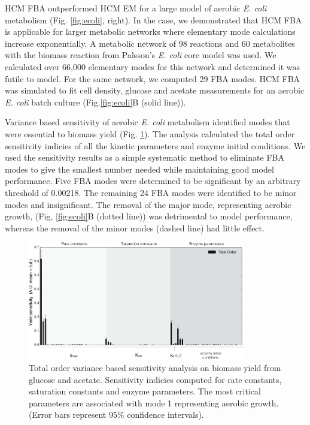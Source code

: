 \documentclass[10pt,twocolumn,twoside,final]{IEEEtran}
\begin{document}
HCM FBA outperformed HCM EM for a large model of aerobic \textit{E. coli} metabolism (Fig. \ref{fig:ecoli}, right).
In the case, we demonstrated that HCM FBA is applicable for larger metabolic networks where elementary mode calculations increase exponentially.
A metabolic network\cite{2007_schuetz_etal_MolSysBio} of 98 reactions and 60 metabolites with the biomass reaction from Palsson's \textit{E. coli} core model\cite{2006_Palsson_model} was used.
We calculated over 66,000 elementary modes for this network and determined it was futile to model.
For the same network, we computed 29 FBA modes.
HCM FBA was simulated to fit cell density, glucose and acetate measurements for an aerobic \textit{E. coli} batch culture\cite{1994_varma_palsson_ApplEnvMicro} (Fig.\ref{fig:ecoli}B (solid line)).

Variance based sensitivity of aerobic \textit{E. coli} metabolism identified modes that were essential to biomass yield (Fig. \ref{fig:sensitivity}).
The analysis calculated the total order sensitivity indicies of all the kinetic parameters and enzyme initial conditions.
We used the sensitivity results as a simple systematic method to eliminate FBA modes to give the smallest number needed while maintaining good model performance.
Five FBA modes were determined to be significant by an arbitrary threshold of 0.00218.
The remaining 24 FBA modes were identified to be minor modes and insignificant.
The removal of the major mode, representing aerobic growth, (Fig, \ref{fig:ecoli}B (dotted line)) was detrimental to model performance, whereas the removal of the minor modes (dashed line) had little effect.

\begin{figure}[!t]\centering
\includegraphics[width=0.85\textwidth]{./figs/Fig-3-Sensitivity-Results.pdf}
\caption{Total order variance based sensitivity analysis on biomass yield from glucose and acetate. Sensitivity indicies computed for rate constants, saturation constants and enzyme parameters. The most critical parameters are associated with mode 1 representing aerobic growth. (Error bars represent 95\% confidence intervals).
}
\label{fig:sensitivity}
\end{figure}
\end{document}
